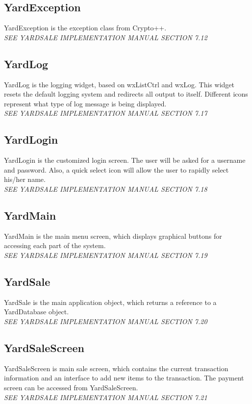 \documentclass{report}
\begin{document}
\begin{itemize}
        \subsection{YardException}
        YardException is the exception class from Crypto++.\\
        {\sl SEE YARDSALE IMPLEMENTATION MANUAL SECTION 7.12}

        \subsection{YardLog}
        YardLog is the logging widget, based on wxListCtrl and wxLog.
        This widget resets the default logging system and redirects
        all output to itself.  Different icons represent what type of
        log message is being displayed.\\
        {\sl SEE YARDSALE IMPLEMENTATION MANUAL SECTION 7.17}

        \subsection{YardLogin}
        YardLogin is the customized login screen.  The user will be
        asked for a username and password.  Also, a quick select icon
        will allow the user to rapidly select his/her name.\\
        {\sl SEE YARDSALE IMPLEMENTATION MANUAL SECTION 7.18}

        \subsection{YardMain}
        YardMain is the main menu screen, which displays graphical
        buttons for accessing each part of the system.\\
        {\sl SEE YARDSALE IMPLEMENTATION MANUAL SECTION 7.19}

        \subsection{YardSale}
        YardSale is the main application object, which returns a
        reference to a YardDatabase object.\\
        {\sl SEE YARDSALE IMPLEMENTATION MANUAL SECTION 7.20}

        \subsection{YardSaleScreen}
        YardSaleScreen is main sale screen, which contains the current
        transaction information and an interface to add new items to
        the transaction.  The payment screen can be accessed from
        YardSaleScreen.\\
        {\sl SEE YARDSALE IMPLEMENTATION MANUAL SECTION 7.21}


\end{itemize}
\end{document}
